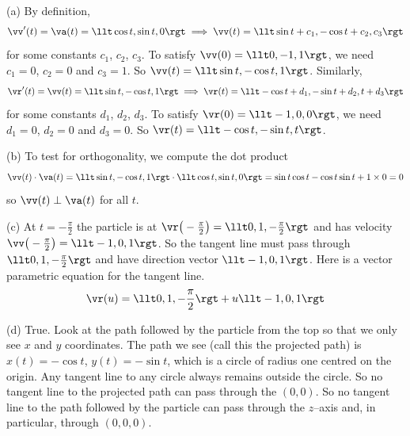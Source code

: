 \begin{solution}
(a) By definition,
\begin{equation*}
\vv'(t)=\va(t)=\llt \cos t,\sin t,0\rgt
\implies \vv(t)=\llt \sin t+c_1, -\cos t+c_2, c_3\rgt
\end{equation*}
for some constants $c_1$, $c_2$, $c_3$. To satisfy $\vv(0)=\llt 0,-1,1\rgt$,
we need $c_1=0$, $c_2=0$ and $c_3=1$. So 
$\vv(t)=\llt \sin t, -\cos t, 1\rgt$. Similarly,
\begin{equation*}
\vr'(t)=\vv(t)=\llt \sin t,-\cos t,1\rgt
\implies \vr(t)=\llt -\cos t+d_1, -\sin t+d_2, t+d_3\rgt
\end{equation*}
for some constants $d_1$, $d_2$, $d_3$. To satisfy $\vr(0)=\llt -1,0,0\rgt$,
we need $d_1=0$, $d_2=0$ and $d_3=0$. So 
$\vr(t)=\llt -\cos t, -\sin t, t\rgt$.

(b) To test for orthogonality, we compute the dot product
\begin{equation*}
\vv(t)\cdot\va(t)=\llt \sin t, -\cos t, 1\rgt\cdot\llt \cos t,\sin t,0\rgt
=\sin t\cos t-\cos t \sin t+1\times 0=0
\end{equation*}
so $\vv(t)\perp\va(t)$ for all $t$.

(c) 
At $t=-\frac{\pi}{2}$ the particle is at 
$\vr\big(-\frac{\pi}{2}\big)=\llt 0,1,-\frac{\pi}{2}\rgt$ and has velocity
$\vv\big(-\frac{\pi}{2}\big)=\llt -1,0,1\rgt$. So the tangent line must pass through $\llt 0,1,-\frac{\pi}{2}\rgt$ and have direction vector
$\llt -1,0,1\rgt$. Here is a vector parametric
equation for the tangent line.
\begin{equation*}
\vr(u)=\llt 0,1,-\frac{\pi}{2}\rgt+u\llt -1,0,1\rgt
\end{equation*}

(d) True. Look at the path followed by the particle from
the top so that we only see $x$ and $y$ coordinates. The path we see (call
this the projected path) is
$x(t)=-\cos t$, $y(t)=-\sin t$, which is a circle of radius one centred
on the origin. Any tangent line to any circle always remains outside the
circle. So no tangent line to the projected path can pass through the $(0,0)$.
So no tangent line to the path followed by the particle can pass through
the $z$--axis and, in particular, through $(0,0,0)$. 

\end{solution}

